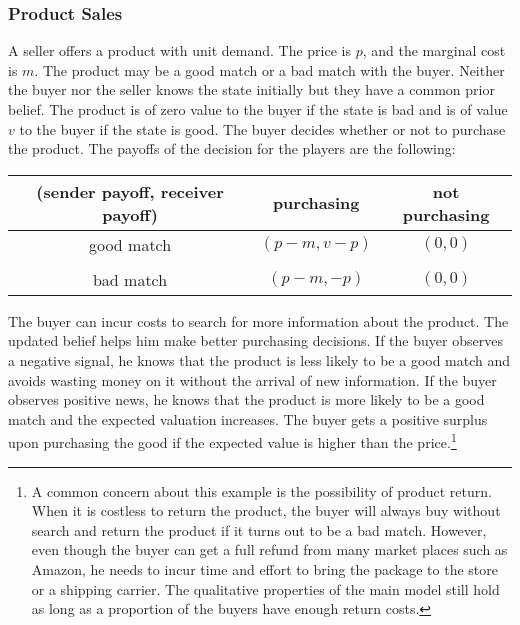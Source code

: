 \documentclass[11pt]{extarticle}
\begin{document}


\subsubsection{Product Sales}\label{productsales}
A seller offers a product with unit demand. The price is $p$, and the marginal cost is $m$. The product may be a good match or a bad match with the buyer. Neither the buyer nor the seller knows the state initially but they have a common prior belief. The product is of zero value to the buyer if the state is bad and is of value $v$ to the buyer if the state is good. The buyer decides whether or not to purchase the product. The payoffs of the decision for the players are the following:
\begin{table}[H] \centering 
	\small
	\begin{tabular}{c c c}
		\\
		\hline
		(sender payoff, receiver payoff)& purchasing & not purchasing \\
		\hline
		good match & $(p-m,v-p)$ & $(0,0)$ \\
		&&\\
		bad match &$(p-m,-p)$ & $(0,0)$ \\
		\hline
	\end{tabular}
\end{table}
The buyer can incur costs to search for more information about the product. The updated belief helps him make better purchasing decisions. If the buyer observes a negative signal, he knows that the product is less likely to be a good match and avoids wasting money on it without the arrival of new information. If the buyer observes positive news, he knows that the product is more likely to be a good match and the expected valuation increases. The buyer gets a positive surplus upon purchasing the good if the expected value is higher than the price.\footnote{A common concern about this example is the possibility of product return. When it is costless to return the product, the buyer will always buy without search and return the product if it turns out to be a bad match. However, even though the buyer can get a full refund from many market places such as Amazon, he needs to incur time and effort to bring the package to the store or a shipping carrier. The qualitative properties of the main model still hold as long as a proportion of the buyers have enough return costs.}
\end{document}
